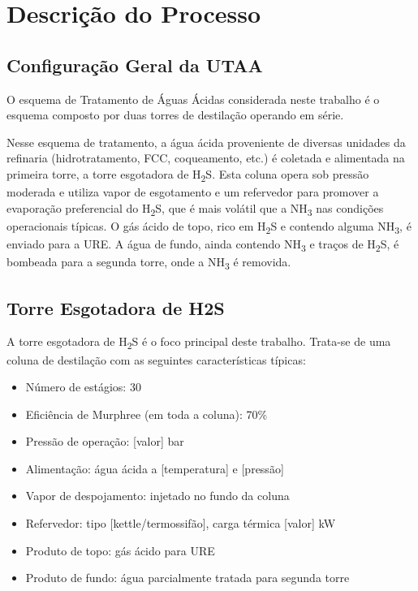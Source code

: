 \section{Descrição do Processo}\label{sec:processo}

\subsection{Configuração Geral da UTAA}

O esquema de Tratamento de Águas Ácidas considerada neste trabalho é o esquema composto por duas torres de destilação operando em série.

Nesse esquema de tratamento, a água ácida proveniente de diversas unidades da refinaria (hidrotratamento, FCC, coqueamento, etc.) é coletada e alimentada na primeira torre, a torre esgotadora de H\textsubscript{2}S. Esta coluna opera sob pressão moderada e utiliza vapor de esgotamento e um refervedor para promover a evaporação preferencial do H\textsubscript{2}S, que é mais volátil que a NH\textsubscript{3} nas condições operacionais típicas. O gás ácido de topo, rico em H\textsubscript{2}S e contendo alguma NH\textsubscript{3}, é enviado para a URE. A água de fundo, ainda contendo NH\textsubscript{3} e traços de H\textsubscript{2}S, é bombeada para a segunda torre, onde a NH\textsubscript{3} é removida.


\subsection{Torre Esgotadora de H2S}

A torre esgotadora de H\textsubscript{2}S é o foco principal deste trabalho. Trata-se de uma coluna de destilação com as seguintes características típicas:

\begin{itemize}[leftmargin=*]
  \item Número de estágios: 30 
  \item Eficiência de Murphree (em toda a coluna): 70\%
  \item Pressão de operação: [valor] bar
  \item Alimentação: água ácida a [temperatura] e [pressão]
  \item Vapor de despojamento: injetado no fundo da coluna
  \item Refervedor: tipo [kettle/termossifão], carga térmica [valor] kW
  \item Produto de topo: gás ácido para URE
  \item Produto de fundo: água parcialmente tratada para segunda torre
\end{itemize}

